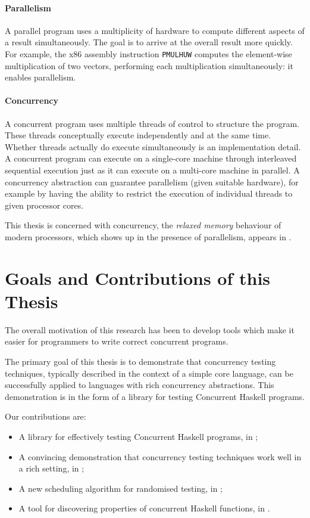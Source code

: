 \paragraph{Parallelism}
A parallel program uses a multiplicity of hardware to compute
different aspects of a result simultaneously.  The goal is to arrive
at the overall result more quickly.  For example, the x86 assembly
instruction \verb#PMULHUW# computes the element-wise multiplication of
two vectors, performing each multiplication simultaneously: it enables
parallelism.

\paragraph{Concurrency}
A concurrent program uses multiple threads of control to
structure the program.  These threads conceptually execute
independently and at the same time.  Whether threads actually do execute
simultaneously is an implementation detail.  A concurrent program can
execute on a single-core machine through interleaved sequential
execution just as it can execute on a multi-core machine in parallel.
A concurrency abstraction can guarantee parallelism (given suitable
hardware), for example by having the ability to restrict the execution
of individual threads to given processor cores.

This thesis is concerned with concurrency, the \emph{relaxed memory}
behaviour of modern processors, which shows up in the presence of
parallelism, appears in .

\section{Goals and Contributions of this Thesis}
\label{sec:intro-contributions}

The overall motivation of this research has been to develop tools
which make it easier for programmers to write correct concurrent
programs.

The primary goal of this thesis is to demonstrate that concurrency
testing techniques, typically described in the context of a simple
core language, can be successfully applied to languages with rich
concurrency abstractions.  This demonstration is in the form of a
library for testing Concurrent Haskell programs.

Our contributions are:

\begin{itemize}
\item A library for effectively testing Concurrent Haskell programs,
  in ;
\item A convincing demonstration that concurrency testing techniques
  work well in a rich setting, in ;
\item A new scheduling algorithm for randomised testing, in
  ;
\item A tool for discovering properties of concurrent Haskell
  functions, in .
\end{itemize}

